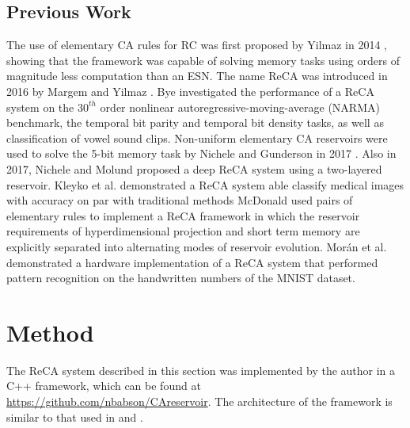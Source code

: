 \documentclass{elsarticle}
\begin{document}
\begin{multicols}{2}
	\subsection{Previous Work}
	
	The use of elementary CA rules for RC was first proposed by Yilmaz in 2014 
	\cite{yilmaz2014reservoir}, showing that the framework was capable of 
	solving memory tasks using orders of magnitude less computation than an ESN.
	The name ReCA was introduced in 2016 by Margem 
	and Yilmaz \cite{margem2017experimental}. Bye \cite{bye2016investigation} investigated the performance 
	of a ReCA system on the $30^{th}$ order nonlinear autoregressive-moving-average 
	(NARMA) benchmark, the temporal bit parity and temporal bit density tasks, 
	as well as classification of vowel sound clips.  
	Non-uniform elementary CA reservoirs were used to solve the 5-bit memory 
	task by Nichele and Gunderson in 2017 \cite{nichele2017reservoir}. Also 
	in 2017, Nichele and Molund \cite{nichele2017deep}
	proposed a deep ReCA system using a 
	two-layered reservoir. Kleyko et al. \cite{kleyko2017modality} 
	demonstrated a ReCA system able classify medical images with accuracy on par 
	with traditional methods McDonald \cite{mcdonald2017reservoir} used pairs 
	of elementary rules to implement a ReCA framework in which the reservoir 
	requirements of hyperdimensional projection and short term memory are 
	explicitly separated into alternating modes of reservoir evolution.  
	Mor{\'a}n et al. \cite{moran2018reservoir}
	demonstrated a hardware implementation of a ReCA 
	system that performed pattern recognition on the handwritten numbers of the 
	MNIST dataset.
	
	
	
	\section{Method}\label{method}
	The ReCA system described in this section was implemented by the author in a 
	C++ framework, which can be found at \url{https://github.com/nbabson/CAreservoir}. The 
	architecture of the framework is similar to that used in  
	\cite{nichele2017deep} and \cite{bye2016investigation}.
	

\end{multicols}
\end{document}
